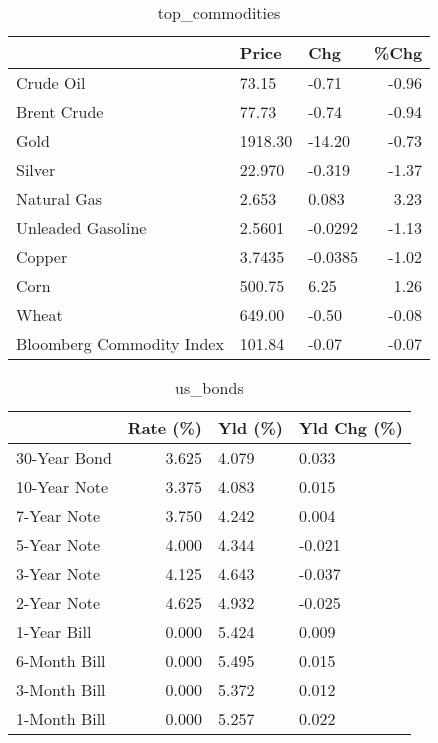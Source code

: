 \documentclass{article}%
\begin{document}
\begin{table}[htbp]%
\caption{top\_commodities}%
\centering%
\begin{adjustbox}{width=1\textwidth}%
\begin{tabular}{lllr}
\toprule
                          &   Price &     Chg &  \%Chg \\
\midrule
               Crude Oil  &   73.15 &   -0.71 & -0.96 \\
             Brent Crude  &   77.73 &   -0.74 & -0.94 \\
                    Gold  & 1918.30 &  -14.20 & -0.73 \\
                  Silver  &  22.970 &  -0.319 & -1.37 \\
             Natural Gas  &   2.653 &   0.083 &  3.23 \\
       Unleaded Gasoline  &  2.5601 & -0.0292 & -1.13 \\
                  Copper  &  3.7435 & -0.0385 & -1.02 \\
                    Corn  &  500.75 &    6.25 &  1.26 \\
                   Wheat  &  649.00 &   -0.50 & -0.08 \\
Bloomberg Commodity Index &  101.84 &   -0.07 & -0.07 \\
\bottomrule
\end{tabular}
%
\end{adjustbox}%
\end{table}

%


\begin{table}[htbp]%
\caption{us\_bonds}%
\centering%
\begin{adjustbox}{width=1\textwidth}%
\begin{tabular}{lrll}
\toprule
             &  Rate (\%) & Yld (\%) & Yld Chg (\%) \\
\midrule
30-Year Bond &     3.625 &   4.079 &       0.033 \\
10-Year Note &     3.375 &   4.083 &       0.015 \\
 7-Year Note &     3.750 &   4.242 &       0.004 \\
 5-Year Note &     4.000 &   4.344 &      -0.021 \\
 3-Year Note &     4.125 &   4.643 &      -0.037 \\
 2-Year Note &     4.625 &   4.932 &      -0.025 \\
 1-Year Bill &     0.000 &   5.424 &       0.009 \\
6-Month Bill &     0.000 &   5.495 &       0.015 \\
3-Month Bill &     0.000 &   5.372 &       0.012 \\
1-Month Bill &     0.000 &   5.257 &       0.022 \\
\bottomrule
\end{tabular}
%
\end{adjustbox}%
\end{table}
\end{document}
